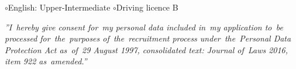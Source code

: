 \documentclass[11pt,a4paper]{article}
\newcommand*\header[1]{
    \noindent\raisebox{.1cm}{\color{MidnightBlue}\rule{1.5cm}{.05cm}\hspace{.2cm}\raisebox{-.1cm}{\large\bf #1}}}
\begin{document}
    \bigskip

    \header{Miscellaneous}

    \medskip
    \hspace{.4cm}
    $\circ$\hspace{.18cm}English: Upper-Intermediate
    \hspace{.32cm}
    $\circ$\hspace{.18cm}Driving licence B


    \vspace*{\fill}

    \noindent\textit{\small
        ''I~hereby give consent for~my personal data included in~my application to~be processed for~the~purposes
        of~the~recruitment process under~the~Personal Data Protection Act as~of~29 August 1997, consolidated text:
        Journal of~Laws 2016, item 922 as~amended.''}
\end{document}
